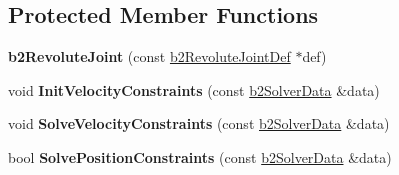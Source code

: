 \subsection*{Protected Member Functions}
\begin{DoxyCompactItemize}
\item 
{\bfseries b2\+Revolute\+Joint} (const \hyperlink{structb2_revolute_joint_def}{b2\+Revolute\+Joint\+Def} $\ast$def)\hypertarget{classb2_revolute_joint_a2571c1438e909fb3518de6f88bb29e01}{}\label{classb2_revolute_joint_a2571c1438e909fb3518de6f88bb29e01}

\item 
void {\bfseries Init\+Velocity\+Constraints} (const \hyperlink{structb2_solver_data}{b2\+Solver\+Data} \&data)\hypertarget{classb2_revolute_joint_af8f5a4b3fac025f0a0e5474b81667dfb}{}\label{classb2_revolute_joint_af8f5a4b3fac025f0a0e5474b81667dfb}

\item 
void {\bfseries Solve\+Velocity\+Constraints} (const \hyperlink{structb2_solver_data}{b2\+Solver\+Data} \&data)\hypertarget{classb2_revolute_joint_a9971ccf2570c9bf8c2e816aa5c0db05a}{}\label{classb2_revolute_joint_a9971ccf2570c9bf8c2e816aa5c0db05a}

\item 
bool {\bfseries Solve\+Position\+Constraints} (const \hyperlink{structb2_solver_data}{b2\+Solver\+Data} \&data)\hypertarget{classb2_revolute_joint_ad07e86dedb1f42c7d78129a65c0184fc}{}\label{classb2_revolute_joint_ad07e86dedb1f42c7d78129a65c0184fc}

\end{DoxyCompactItemize}
